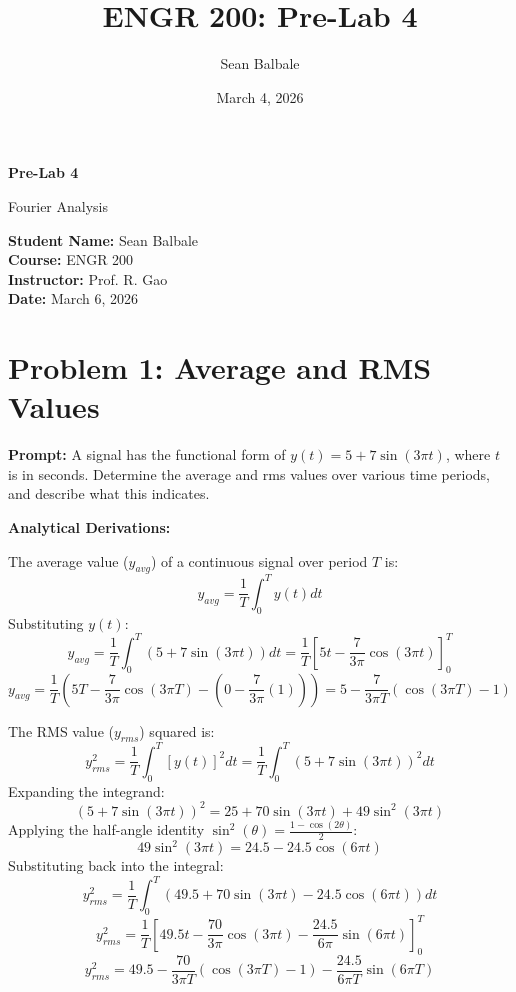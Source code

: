 \documentclass[11pt]{article}
\title{ENGR 200: Pre-Lab 4}
\author{Sean Balbale}
\date{March 4, 2026}
\begin{document}
\begin{titlepage}
  \begin{center}
    \vspace*{1in}

    \Huge
    \textbf{Pre-Lab 4}

    \LARGE
    Fourier Analysis

    \vspace{3in}

    \textbf{Student Name:} Sean Balbale
    \\ \textbf{Course:} ENGR 200
    \\ \textbf{Instructor:} Prof. R. Gao
    \\ \textbf{Date:} March 6, 2026

    \vfill

  \end{center}
\end{titlepage}

\newpage

\section*{Problem 1: Average and RMS Values}

\textbf{Prompt:} A signal has the functional form of $y(t) = 5 + 7 \sin(3\pi t)$, where $t$ is in seconds. Determine the average and rms values over various time periods, and describe what this indicates.

\textbf{Analytical Derivations:}

The average value ($y_{avg}$) of a continuous signal over period $T$ is:
\[ y_{avg} = \frac{1}{T} \int_0^T y(t) dt \]
Substituting $y(t)$:
\[ y_{avg} = \frac{1}{T} \int_0^T (5 + 7 \sin(3\pi t)) dt = \frac{1}{T} \left[ 5t - \frac{7}{3\pi} \cos(3\pi t) \right]_0^T \]
\[ y_{avg} = \frac{1}{T} \left( 5T - \frac{7}{3\pi} \cos(3\pi T) - \left( 0 - \frac{7}{3\pi}(1) \right) \right) = 5 - \frac{7}{3\pi T} (\cos(3\pi T) - 1) \]

The RMS value ($y_{rms}$) squared is:
\[ y_{rms}^2 = \frac{1}{T} \int_0^T [y(t)]^2 dt = \frac{1}{T} \int_0^T (5 + 7 \sin(3\pi t))^2 dt \]
Expanding the integrand:
\[ (5 + 7 \sin(3\pi t))^2 = 25 + 70 \sin(3\pi t) + 49 \sin^2(3\pi t) \]
Applying the half-angle identity $\sin^2(\theta) = \frac{1 - \cos(2\theta)}{2}$:
\[ 49 \sin^2(3\pi t) = 24.5 - 24.5 \cos(6\pi t) \]
Substituting back into the integral:
\[ y_{rms}^2 = \frac{1}{T} \int_0^T \left( 49.5 + 70 \sin(3\pi t) - 24.5 \cos(6\pi t) \right) dt \]
\[ y_{rms}^2 = \frac{1}{T} \left[ 49.5t - \frac{70}{3\pi} \cos(3\pi t) - \frac{24.5}{6\pi} \sin(6\pi t) \right]_0^T \]
\[ y_{rms}^2 = 49.5 - \frac{70}{3\pi T} (\cos(3\pi T) - 1) - \frac{24.5}{6\pi T} \sin(6\pi T) \]
\end{document}

